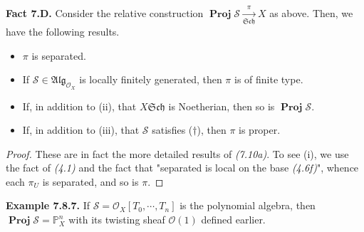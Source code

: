 \documentclass[11pt,a4paper,footinclude=true,headinclude=true]{scrbook} %
\DeclareMathOperator{\PROJ}{\mathbf{Proj}}
\newcommand{\OO}{\mathcal{O}}
\newcommand{\Ss}{\mathscr{S}}
\newcommand{\PP}{\mathbb{P}}
\newcommand{\Sch}{\mathfrak{Sch}}
\newcommand{\<}{\langle}
\newcommand{\>}{\rangle}
\newcommand{\ALG}{\mathfrak{Alg}}
\newenvironment{fact}[2][Fact]
    { \begin{mdframed}[backgroundcolor=gray!20] \textbf{#1 #2.} }
    {  \end{mdframed}}
\newenvironment{example}[2][Example]
    { \begin{mdframed}[backgroundcolor=gray!20] \textbf{#1 #2.} }
    {  \end{mdframed}}
\begin{document}
\begin{fact}{7.D}
    Consider the relative construction $\PROJ\Ss\xrightarrow[\Sch]{\pi}X$ as above. Then, we have the following results.
    \begin{itemize}
        \item[(i)] $\pi$ is separated.
        \item[(ii)] If $\Ss\in\ALG_{\OO_X}$ is locally finitely generated, then $\pi$ is of finite type.
        \item[(iii)] If, in addition to (ii), that $X\Sch$ is Noetherian, then so is $\PROJ\Ss$.
        \item[(iv)] If, in addition to (iii), that $\Ss$ satisfies ($\dagger$), then $\pi$ is proper.
    \end{itemize}
\end{fact}
\begin{proof}
    These are in fact the more detailed results of \textit{(7.10a)}. To see (i), we use the fact of \textit{(4.1)} and the fact that "separated is local on the base \textit{(4.6f)}", whence each $\pi_U$ is separated, and so is $\pi$.
\end{proof}

\begin{example}{7.8.7}
    If $\Ss=\OO_X[T_0,\cdots,T_n]$ is the polynomial algebra, then $\PROJ\Ss=\PP_X^n$ with its twisting sheaf $\OO(1)$ defined earlier.
\end{example}
\end{document}
